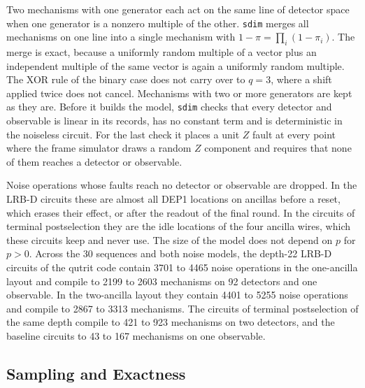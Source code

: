 Two mechanisms with one generator each act on the same line of detector space when one generator is a nonzero multiple of the other. \texttt{sdim} merges all mechanisms on one line into a single mechanism with $1 - \pi = \prod_i (1 - \pi_i)$. The merge is exact, because a uniformly random multiple of a vector plus an independent multiple of the same vector is again a uniformly random multiple. The XOR rule of the binary case does not carry over to $q = 3$, where a shift applied twice does not cancel. Mechanisms with two or more generators are kept as they are. Before it builds the model, \texttt{sdim} checks that every detector and observable is linear in its records, has no constant term and is deterministic in the noiseless circuit. For the last check it places a unit $Z$ fault at every point where the frame simulator draws a random $Z$ component and requires that none of them reaches a detector or observable.

Noise operations whose faults reach no detector or observable are dropped. In the LRB-D circuits these are almost all DEP1 locations on ancillas before a reset, which erases their effect, or after the readout of the final round. In the circuits of terminal postselection they are the idle locations of the four ancilla wires, which these circuits keep and never use. The size of the model does not depend on $p$ for $p > 0$. Across the 30 sequences and both noise models, the depth-22 LRB-D circuits of the qutrit code contain 3701 to 4465 noise operations in the one-ancilla layout and compile to 2199 to 2603 mechanisms on 92 detectors and one observable. In the two-ancilla layout they contain 4401 to 5255 noise operations and compile to 2867 to 3313 mechanisms. The circuits of terminal postselection of the same depth compile to 421 to 923 mechanisms on two detectors, and the baseline circuits to 43 to 167 mechanisms on one observable.

\subsection{Sampling and Exactness}
\label{app:sdim-sampling}

